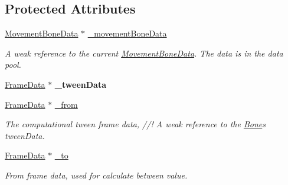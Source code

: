 \subsection*{Protected Attributes}
\begin{DoxyCompactItemize}
\item 
\mbox{\label{classcocostudio_1_1Tween_ac3ee31d8e72dcc04428687135148b105}} 
\hyperlink{classcocostudio_1_1MovementBoneData}{Movement\+Bone\+Data} $\ast$ \hyperlink{classcocostudio_1_1Tween_ac3ee31d8e72dcc04428687135148b105}{\+\_\+movement\+Bone\+Data}
\begin{DoxyCompactList}\small\item\em A weak reference to the current \hyperlink{classcocostudio_1_1MovementBoneData}{Movement\+Bone\+Data}. The data is in the data pool. \end{DoxyCompactList}\item 
\mbox{\label{classcocostudio_1_1Tween_a5528fcb7a9cf2e326ac455ed933b4284}} 
\hyperlink{classcocostudio_1_1FrameData}{Frame\+Data} $\ast$ {\bfseries \+\_\+tween\+Data}
\item 
\mbox{\label{classcocostudio_1_1Tween_a2d1af5d99ca803ad854333aa56fa74e7}} 
\hyperlink{classcocostudio_1_1FrameData}{Frame\+Data} $\ast$ \hyperlink{classcocostudio_1_1Tween_a2d1af5d99ca803ad854333aa56fa74e7}{\+\_\+from}
\begin{DoxyCompactList}\small\item\em The computational tween frame data, //! A weak reference to the \hyperlink{classcocostudio_1_1Bone}{Bone}\textquotesingle{}s tween\+Data. \end{DoxyCompactList}\item 
\mbox{\label{classcocostudio_1_1Tween_a0fb88ac0a203f0c6ce4cda169e4bbe7f}} 
\hyperlink{classcocostudio_1_1FrameData}{Frame\+Data} $\ast$ \hyperlink{classcocostudio_1_1Tween_a0fb88ac0a203f0c6ce4cda169e4bbe7f}{\+\_\+to}
\begin{DoxyCompactList}\small\item\em From frame data, used for calculate between value. \end{DoxyCompactList}\item 
\mbox{\label{classcocostudio_1_1Tween_a2dbcfc8629ffb69459d7e4228230e0c4}} 

\end{DoxyCompactItemize}
